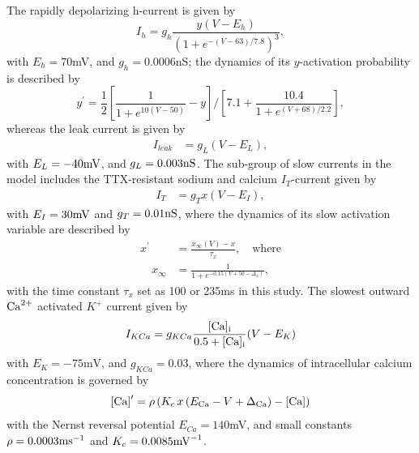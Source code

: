 \documentclass[nofootinbib,aip,amsmath,amssymb,preprint,twocolumn,floatfix,10pt]{revtex4-2}
\begin{document}
The rapidly depolarizing h-current is given by 
\begin{equation}
I_{h}=g_{h} \frac{y (V-E_{h})}{(1+e^{-(V-63)/7.8})^3}, 
\end{equation}
with $E_{h}=70$mV, and $g_h=0.0006$nS; the dynamics of its $y$-activation probability is described by 
 \begin{equation}
{y}^\prime = \frac{1}{2} \left [ \frac{1}{1+e^{10(V-50)}}-y \right ]/ \left [ 7.1+\frac{10.4}{1+e^{(V+68)/2.2}} \right ], 
\end{equation}	
whereas the leak current is given by 
\begin{align}
I_{leak} &=g_{L} (V-E_{L}), 
\end{align}
with $E_{L} =-40{\rm mV}$, and $g_{L}=0.003{\rm nS}$. The sub-group of slow currents in the model includes the TTX-resistant sodium and calcium $I_{T}$-current given by   \begin{align}
 I_{T} &= g_{T} x (V-E_{I}),
\end{align}
with $E_{I} =30{\rm mV}$ and $g_{T}=0.01{\rm nS}$, where the dynamics of its slow activation variable are described by  
 \begin{align}
{x}^\prime &= \frac{x_{\infty}(V)-x}{\tau_{x}}, \quad \mbox{where} \\ 
\quad x_{\infty} &= \frac{1}{1+e^{-0.15(V+50-\Delta_x)}},
\end{align}\label{eqttx} 
with the time constant $\tau_{x}$ set as 100 or 235ms in this study. The slowest outward ${\rm Ca}^{2+}$ activated $K^+$ current given by  
\begin{equation}
I_{KCa} =g_{KCa}\frac{[\rm Ca]_i}{0.5+[\rm Ca]_i}(V-E_{K})
 \label{IKCa}
\end{equation}
with  $E_{K}=-75\mbox{mV}$, and $g_{KCa}=0.03$, where the dynamics of intracellular calcium concentration is governed by 
\begin{equation}
{[\rm Ca]}^\prime  =  \rho \left ( K_{c}\, x\, (E_{\rm Ca}-V + \Delta_{\rm Ca})-[\rm Ca] \right  )  \label{eqCa}
\end{equation}
with the Nernst reversal potential  $E_{Ca}=140$mV, and small constants $\rho= 0.0003{\rm ms}^{-1}$ and  $K_c=0.0085{\rm mV}^{-1}$.
\end{document}

